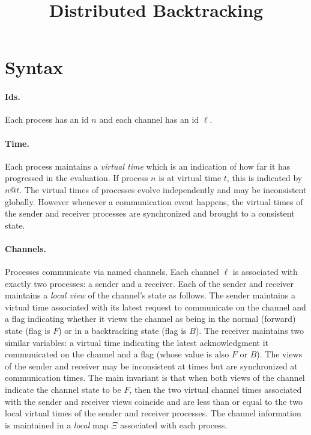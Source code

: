 \documentclass{article}
\title{Distributed Backtracking}
\author{}
\date{}
\begin{document}
\maketitle

\newcommand{\todo}[1]{\fbox{#1}}

\newcommand{\alt}{~|~}
\newcommand{\parc}[2]{#1 \,\|\, #2}
\newcommand{\send}[2]{\texttt{send}~#1~#2}
\newcommand{\stable}[1]{\texttt{stable}~#1}
\newcommand{\stableu}[1]{\underline{\texttt{stable}}~#1}
\newcommand{\backtrack}[1]{\texttt{backtrack}~#1}
\newcommand{\abacktrack}{\texttt{backtrack}\_}
\newcommand{\recv}[6]{\texttt{recv}~(#1.#2~#5) \talloblong (#3.#4~#6)}
\newcommand{\proc}[5]{\langle #1@#5:~ #3, #2,#4 \rangle}

\section{Syntax} 

\paragraph*{Ids.} Each process has an id $n$ and each channel has an id
$\ell$.

\paragraph*{Time.} Each process maintains a \emph{virtual time} which is an
indication of how far it has progressed in the evaluation. If process $n$ is
at virtual time $t$, this is indicated by $n@t$. The virtual times of
processes evolve independently and may be inconsistent globally. However
whenever a communication event happens, the virtual times of the sender and
receiver processes are synchronized and brought to a consistent state.

\paragraph*{Channels.} Processes communicate via named channels. Each channel
$\ell$ is associated with exactly two processes: a sender and a receiver.
Each of the sender and receiver maintains a \emph{local view} of the
channel's state as follows. The sender maintains a virtual time associated
with its latest request to communicate on the channel and a flag indicating
whether it views the channel as being in the normal (forward) state (flag is
$F$) or in a backtracking state (flag is $B$). The receiver maintains two
similar variables: a virtual time indicating the latest acknowledgment it
communicated on the channel and a flag (whose value is also $F$ or $B$).  The
views of the sender and receiver may be inconsistent at times but are
synchronized at communication times. The main invariant is that when both
views of the channel indicate the channel state to be $F$, then the two
virtual channel times associated with the sender and receiver views coincide
and are less than or equal to the two local virtual times of the sender and
receiver processes. The channel information is maintained in a \emph{local}
map $\Xi$ associated with each process.
\end{document}
